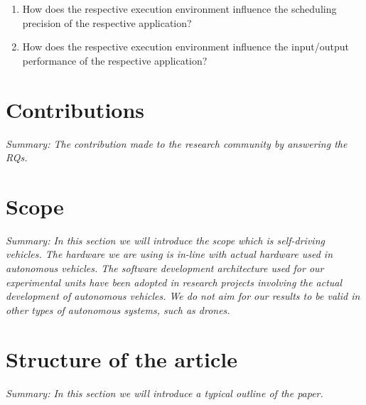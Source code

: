 \begin{enumerate}[label=\textbf{RQ\arabic*}]
\label{section:rqs}
	\item How does the respective execution environment influence the scheduling precision of the respective application?
	\item How does the respective execution environment influence the input/output performance of the respective application?\\
\end{enumerate}


\section{Contributions}
\textit{Summary: The contribution made to the research community by answering the RQs.} 


\section{Scope}
\textit{Summary: In this section we will introduce the scope which is self-driving vehicles. The hardware we are using is in-line with actual hardware used in autonomous vehicles. The software development architecture used for our experimental units have been adopted in research projects involving the actual development of autonomous vehicles. We do not aim for our results to be valid in other types of autonomous systems, such as drones. }

\section{Structure of the article}

\textit{Summary: In this section we will introduce a typical outline of the paper.}


	